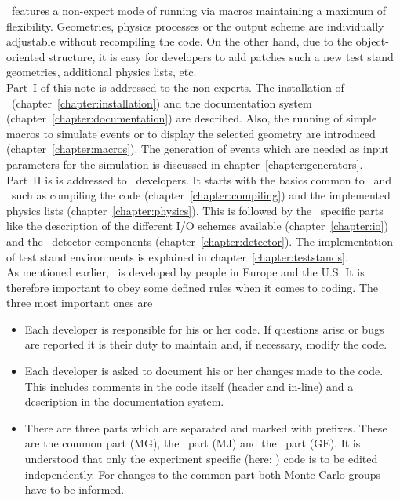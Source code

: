 \mage\ features a non-expert mode of running via macros maintaining a
maximum of flexibility. Geometries, physics processes or the output
scheme are individually adjustable without recompiling the code. On the
other hand, due to the object-oriented structure, it is easy for
developers to add patches such a new test stand geometries, additional
physics lists, etc. \\

Part~I of this note is addressed to the non-experts. The installation of
\mage\ (chapter~\ref{chapter:installation}) and the documentation
system (chapter~\ref{chapter:documentation}) are described. Also, the
running of simple macros to simulate events or to display the selected
geometry are introduced (chapter~\ref{chapter:macros}). The generation
of events which are needed as input parameters for the simulation is
discussed in chapter~\ref{chapter:generators}. \\

Part~II is is addressed to \mage\ developers. It starts with the basics
common to \majorana\ and \gerda\ such as compiling the code
(chapter~\ref{chapter:compiling}) and the implemented physics lists
(chapter~\ref{chapter:physics}). This is followed by the \gerda\
specific parts like the description of the different I/O schemes
available (chapter~\ref{chapter:io}) and the \gerda\ detector
components (chapter~\ref{chapter:detector}). The implementation of
test stand environments is explained in
chapter~\ref{chapter:teststands}. \\

As mentioned earlier, \mage\ is developed by people in Europe and the
U.S. It is therefore important to obey some defined rules when it
comes to coding. The three most important ones are
%
\begin{itemize} 
\item Each developer is responsible for his or her code. If questions 
arise or bugs are reported it is their duty to maintain and, if
necessary, modify the code.
% 
\item Each developer is asked to document his or her changes made to 
the code. This includes comments in the code itself (header and
in-line) and a description in the documentation system. 
% 
\item There are three parts which are separated and marked with prefixes. 
These are the common part (MG), the \majorana\ part (MJ) and the
\gerda\ part (GE). It is understood that only the experiment specific
(here: \gerda) code is to be edited independently. For changes to the
common part both Monte Carlo groups have to be informed. 
\end{itemize} 
